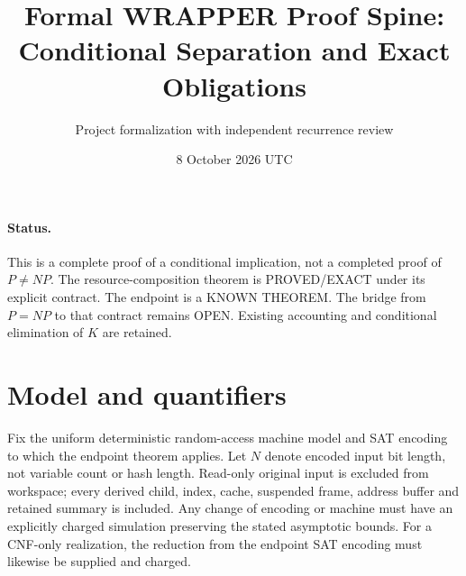 \documentclass[11pt]{article}
\title{Formal WRAPPER Proof Spine: Conditional Separation and Exact Obligations}
\author{Project formalization with independent recurrence review}
\date{8 October 2026 UTC}
\begin{document}
\sloppy\maketitle
\paragraph{Status.} This is a complete proof of a conditional implication,
not a completed proof of $P\ne NP$. The resource-composition theorem is
PROVED/EXACT under its explicit contract. The endpoint is a KNOWN THEOREM.
The bridge from $P=NP$ to that contract remains OPEN. Existing accounting
and conditional elimination of $K$ are retained.

\section{Model and quantifiers}
Fix the uniform deterministic random-access machine model and SAT encoding
to which the endpoint theorem applies. Let $N$ denote encoded input bit
length, not variable count or hash length. Read-only original input is
excluded from workspace; every derived child, index, cache, suspended
frame, address buffer and retained summary is included. Any change of
encoding or machine must have an explicitly charged simulation preserving
the stated asymptotic bounds. For a CNF-only realization, the reduction
from the endpoint SAT encoding must likewise be supplied and charged.
\end{document}
